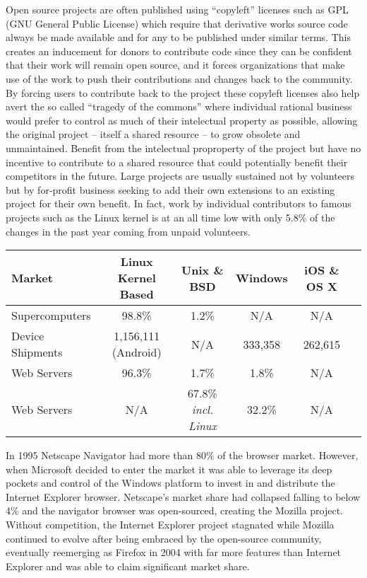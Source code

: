Open source projects are often published using ``copyleft'' licenses such as GPL (GNU General Public License) which require that derivative works source code always be made available and for any to be published under similar terms.
This creates an inducement for donors to contribute code since they can be confident that their work will remain open source, and it forces organizations that make use of the work to push their contributions and changes back to the community.\autocite[198]{buxmann2012software}
By forcing users to contribute back to the project these copyleft licenses also help avert the so called ``tragedy of the commons'' where individual rational business would prefer to control as much of their intelectual property as possible, allowing the original project -- itself a shared resource -- to grow obsolete and unmaintained.
Benefit from the intelectual proproperty of the project but have no incentive to contribute to a shared resource that could potentially benefit their competitors in the future.
Large projects are usually sustained not by volunteers but by for-profit business seeking to add their own extensions to an existing project for their own benefit.
In fact, work by individual contributors to famous projects such as the Linux kernel is at an all time low with only 5.8\% of the changes in the past year coming from unpaid volunteers.\autocite[]{KernelDevelopment2015}

\begin{minipage}{\textwidth}
\begin{tabular}{| l | c | c | c | c | c |} \hline
    Market & Linux Kernel Based & Unix \& BSD & Windows & iOS \& OS X \\ \hline
    Supercomputers\autocite{Top500} & 98.8\% & 1.2\% & N/A & N/A \\ \hline
    Device Shipments\autocite{Gartner} & 1,156,111 (Android) & N/A & 333,358 & 262,615 \\ \hline
    Web Servers\autocite{W3Cook} & 96.3\% & 1.7\% & 1.8\% &  N/A \\ \hline
    Web Servers\autocite{W3Techs} & N/A & 67.8\% \emph{incl. Linux} & 32.2\% & N/A \\ \hline
\end{tabular}
\end{minipage}


In 1995 Netscape Navigator had more than 80\% of the browser market. However, when Microsoft decided to enter the market it was able to leverage its deep pockets and control of the Windows platform to invest in and distribute the Internet Explorer browser.\autocite[27]{buxmann2012software}
Netscape's market share had collapsed falling to below 4\% and the navigator browser was open-sourced, creating the Mozilla project.\autocite[27]{buxmann2012software}
Without competition, the Internet Explorer project stagnated while Mozilla continued to evolve after being embraced by the open-source community, eventually reemerging as Firefox in 2004 with far more features than Internet Explorer and was able to claim significant market share.\autocite[27]{buxmann2012software}

